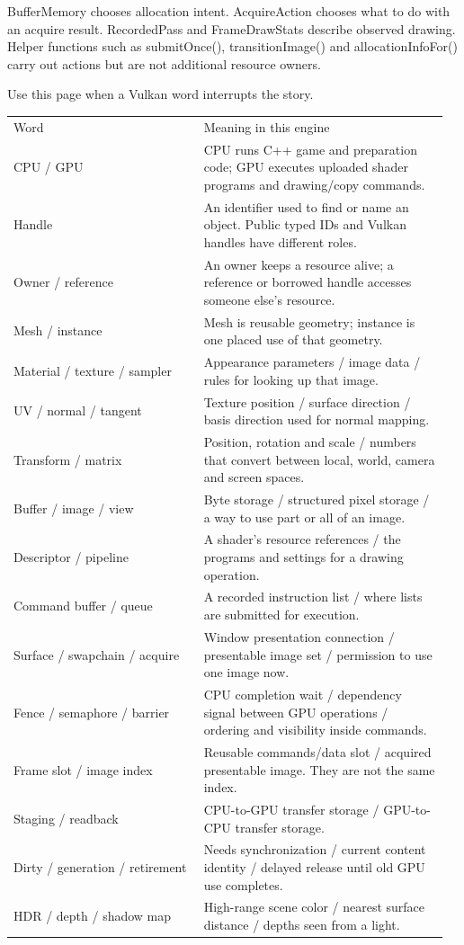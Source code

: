 \documentclass[11pt,a4paper]{article}
\begin{document}
BufferMemory chooses allocation intent. AcquireAction chooses what to do with an acquire result. RecordedPass and FrameDrawStats describe observed drawing. Helper functions such as submitOnce(), transitionImage() and allocationInfoFor() carry out actions but are not additional resource owners.

\label{core-50}
Use this page when a Vulkan word interrupts the story.

{\small
\begin{longtable}{@{}p{0.42\linewidth}p{0.54\linewidth}@{}}
Word & Meaning in this engine \\
CPU / GPU & CPU runs C++ game and preparation code; GPU executes uploaded shader programs and drawing/copy commands. \\
Handle & An identifier used to find or name an object. Public typed IDs and Vulkan handles have different roles. \\
Owner / reference & An owner keeps a resource alive; a reference or borrowed handle accesses someone else's resource. \\
Mesh / instance & Mesh is reusable geometry; instance is one placed use of that geometry. \\
Material / texture / sampler & Appearance parameters / image data / rules for looking up that image. \\
UV / normal / tangent & Texture position / surface direction / basis direction used for normal mapping. \\
Transform / matrix & Position, rotation and scale / numbers that convert between local, world, camera and screen spaces. \\
Buffer / image / view & Byte storage / structured pixel storage / a way to use part or all of an image. \\
Descriptor / pipeline & A shader's resource references / the programs and settings for a drawing operation. \\
Command buffer / queue & A recorded instruction list / where lists are submitted for execution. \\
Surface / swapchain / acquire & Window presentation connection / presentable image set / permission to use one image now. \\
Fence / semaphore / barrier & CPU completion wait / dependency signal between GPU operations / ordering and visibility inside commands. \\
Frame slot / image index & Reusable commands/data slot / acquired presentable image. They are not the same index. \\
Staging / readback & CPU-to-GPU transfer storage / GPU-to-CPU transfer storage. \\
Dirty / generation / retirement & Needs synchronization / current content identity / delayed release until old GPU use completes. \\
HDR / depth / shadow map & High-range scene color / nearest surface distance / depths seen from a light. \\
\end{longtable}
}
\end{document}
